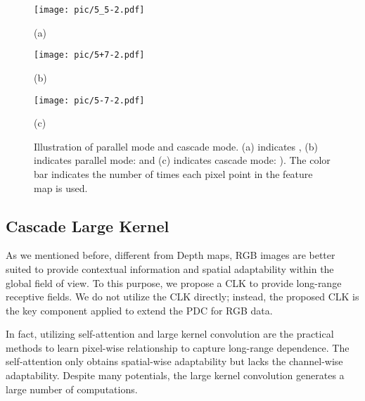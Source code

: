 \documentclass[lettersize,journal]{IEEEtran}
\begin{document}
\begin{figure}[t]
    \centering
    \begin{minipage}[c]{0.32\linewidth}
        \centering
        \centerline{
        \texttt{[image: pic/5\_5-2.pdf]}
        }
        \centerline{(a)}
    \end{minipage}
    \begin{minipage}[c]{0.32\linewidth}
        \centering
        \centerline{
        \texttt{[image: pic/5+7-2.pdf]}
}
        \centerline{(b)}
    \end{minipage}
    \begin{minipage}[c]{0.32\linewidth}
        \centering
        \centerline{
        \texttt{[image: pic/5-7-2.pdf]}
}
        \centerline{(c)}
    \end{minipage}

     \caption{Illustration of parallel mode and cascade mode. (a) indicates , (b) indicates parallel mode:  and (c) indicates cascade mode: ). The color bar indicates the number of times each pixel point in the feature map is used.}
\label{ELKA}
\end{figure}



\subsection{Cascade Large Kernel} 
As we mentioned before, different from Depth maps, RGB images are better suited to provide contextual information and spatial adaptability within the global field of view. To this purpose, we propose a CLK to provide long-range receptive fields.
We do not utilize the CLK directly; instead, the proposed CLK is the key component applied to extend the PDC for RGB data.  \iffalse Therefore, the combination of CLK and PDC, namely CPDC, absorbs the advantage of capturing local gradient features of PDC and long-range dependence of large kernel.\fi 
\iffalse
Considering the different characteristics between Depth and RGB data, instead of dealing with RGB images as Depth images directly applying DDCA, we propose the combination of ELKA and DDCA to focus on more long-range dependence for RGB images. The DDCA is a differential dynamic convolution structure that can easily achieve different receptive fields using different sized convolution kernels. Applying large kernels, the ELKA-DDCA absorbs the advantage of capturing local gradient features of DDCA and long-range dependence of large kernel attention. \fi
\iffalse
In fact, utilizing self-attention \cite{wang2018non,zhu2019asymmetric,zhang2019self} and large kernel convolution \cite{wang2017residual,hu2018gather} are the practical methods to learn pixel-wise relationship to capture long-range dependence. The self-attention only obtains spatial-wise adaptability but lacks the channel-wise adaptability. Despite many potentials, the large kernel convolution generates a large number of computations.
\end{document}
